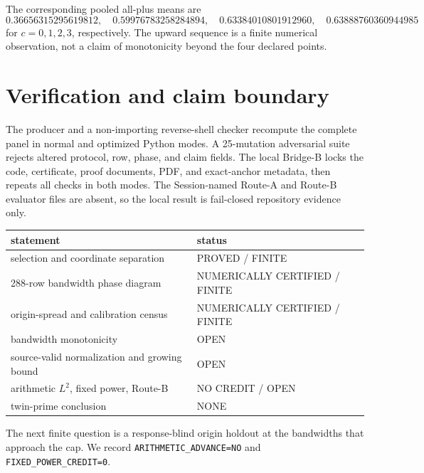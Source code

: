 \documentclass[10pt]{article}
\begin{document}
The corresponding pooled all-plus means are
\[
0.36656315295619812,\quad 0.59976783258284894,\quad
0.63384010801912960,\quad 0.63888760360944985
\]
for \(c=0,1,2,3\), respectively.  The upward sequence is a finite numerical
observation, not a claim of monotonicity beyond the four declared points.

\section{Verification and claim boundary}

The producer and a non-importing reverse-shell checker recompute the complete
panel in normal and optimized Python modes.  A 25-mutation adversarial suite
rejects altered protocol, row, phase, and claim fields.  The local Bridge-B
locks the code, certificate, proof documents, PDF, and exact-anchor metadata,
then repeats all checks in both modes.  The Session-named Route-A and Route-B
evaluator files are absent, so the local result is fail-closed repository
evidence only.

\begin{center}
\small
\begin{tabular}{ll}
\toprule
statement & status\\
\midrule
selection and coordinate separation & PROVED / FINITE\\
288-row bandwidth phase diagram & NUMERICALLY CERTIFIED / FINITE\\
origin-spread and calibration census & NUMERICALLY CERTIFIED / FINITE\\
bandwidth monotonicity & OPEN\\
source-valid normalization and growing bound & OPEN\\
arithmetic \(L^2\), fixed power, Route-B & NO CREDIT / OPEN\\
twin-prime conclusion & NONE\\
\bottomrule
\end{tabular}
\end{center}

The next finite question is a response-blind origin holdout at the bandwidths
that approach the cap.  We record
\texttt{ARITHMETIC\_ADVANCE=NO} and
\texttt{FIXED\_POWER\_CREDIT=0}.
\end{document}
